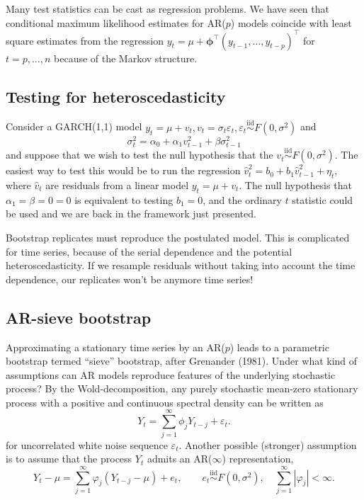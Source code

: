 \documentclass[]{book}
\begin{document}
Many test statistics can be cast as regression problems. We have seen
that conditional maximum likelihood estimates for AR(\(p\)) models
coincide with least square estimates from the regression
\(y_t=\mu+\boldsymbol{\phi}^\top(y_{t-1}, \ldots, y_{t-p})^\top\) for
\(t=p, \ldots, n\) because of the Markov structure.

\subsection{Testing for
heteroscedasticity}\label{testing-for-heteroscedasticity}

Consider a GARCH(1,1) model
\(y_t=\mu + v_t, v_t = \sigma_t\varepsilon_t, \varepsilon_t \stackrel{\mathrm{iid}}{\sim}F(0,\sigma^2)\)
and
\[\sigma^2_t = \alpha_0 + \alpha_1 v_{t-1}^2 + \beta \sigma^2_{t-1}\]
and suppose that we wish to test the null hypothesis that the
\(v_t \stackrel{\mathrm{iid}}{\sim}F(0,\sigma^2)\). The easiest way to
test this would be to run the regression
\(\widehat{v}_t^2 = b_0 + b_1 \widehat{v}_{t-1}^2 + \eta_t\), where
\(\widehat{v}_t\) are residuals from a linear model \(y_t=\mu +v_t\).
The null hypothesis that \(\alpha_1=\beta=0=0\) is equivalent to testing
\(b_1=0\), and the ordinary \(t\) statistic could be used and we are
back in the framework just presented.

Bootstrap replicates must reproduce the postulated model. This is
complicated for time series, because of the serial dependence and the
potential heteroscedasticity. If we resample residuals without taking
into account the time dependence, our replicates won't be anymore time
series!

\subsection{AR-sieve bootstrap}\label{ar-sieve-bootstrap}

Approximating a stationary time series by an AR(\(p\)) leads to a
parametric bootstrap termed ``sieve'' bootstrap, after Grenander (1981).
Under what kind of assumptions can AR models reproduce features of the
underlying stochastic process? By the Wold-decomposition, any purely
stochastic mean-zero stationary process with a positive and continuous
spectral density can be written as
\[Y_t= \sum_{j=1}^\infty \phi_j Y_{t-j} + \varepsilon_t.\] for
uncorrelated white noise sequence \(\varepsilon_t\). Another possible
(stronger) assumption is to assume that the process \(Y_t\) admits an
AR(\(\infty\)) representation,
\[Y_t-\mu=\sum_{j=1}^\infty \varphi_j (Y_{t-j}-\mu) + e_t, \qquad e_t \stackrel{\mathrm{iid}}{\sim}F(0, \sigma^2), \quad \sum_{j=1}^\infty |\varphi_j| < \infty.\]
\end{document}
